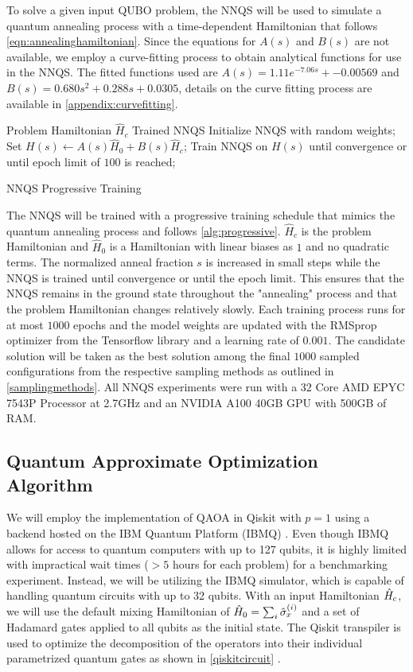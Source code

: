 To solve a given input QUBO problem, the NNQS will be used to simulate a quantum annealing process with a time-dependent Hamiltonian that follows \autoref{eqn:annealinghamiltonian}. Since the equations for $A(s)$ and $B(s)$ are not available, we employ a curve-fitting process to obtain analytical functions for use in the NNQS. The fitted functions used are $A(s) = 1.11e^{-7.06s} + -0.00569$ and $B(s)= 0.680s^2 + 0.288s + 0.0305$, details on the curve fitting process are available in \autoref{appendix:curvefitting}.

\begin{algorithm}
    \begin{algorithmic}
    \Require Problem Hamiltonian $\hat{H}_c$
    \Ensure Trained NNQS
    \State Initialize NNQS with random weights;
    \State Set $H(s) \leftarrow A(s)\hat{H}_0 + B(s)\hat{H}_c$;
    \State Train NNQS on $H(s)$ until convergence or until epoch limit of $100$ is reached;
    \EndFor
    \end{algorithmic}
    \caption{NNQS Progressive Training}
    \label{alg:progressive}
\end{algorithm}

The NNQS will be trained with a progressive training schedule that mimics the quantum annealing process and follows \autoref{alg:progressive}. $\hat{H}_c$ is the problem Hamiltonian and $\hat{H}_0$ is a Hamiltonian with linear biases as $1$ and no quadratic terms. The normalized anneal fraction $s$ is increased in small steps while the NNQS is trained until convergence or until the epoch limit. This ensures that the NNQS remains in the ground state throughout the "annealing" process and that the problem Hamiltonian changes relatively slowly. Each training process runs for at most $1000$ epochs and the model weights are updated with the RMSprop optimizer from the Tensorflow library and a learning rate of $0.001$. The candidate solution will be taken as the best solution among the final $1000$ sampled configurations from the respective sampling methods as outlined in \autoref{samplingmethods}. All NNQS experiments were run with a 32 Core AMD EPYC 7543P Processor at 2.7GHz and an NVIDIA A100 40GB GPU with 500GB of RAM.

\subsection{Quantum Approximate Optimization Algorithm}
We will employ the implementation of QAOA in Qiskit with $p=1$ using a backend hosted on the IBM Quantum Platform (IBMQ) \cite{b24}. Even though IBMQ allows for access to quantum computers with up to 127 qubits, it is highly limited with impractical wait times ($>5$ hours for each problem) for a benchmarking experiment. Instead, we will be utilizing the IBMQ simulator, which is capable of handling quantum circuits with up to 32 qubits. With an input Hamiltonian $\Hat{H}_c$, we will use the default mixing Hamiltonian of $\Hat{H}_0 = \sum_{i}\Hat{\sigma}_x^{(i)}$ and a set of Hadamard gates applied to all qubits as the initial state. The Qiskit transpiler is used to optimize the decomposition of the operators into their individual parametrized quantum gates as shown in \autoref{qiskitcircuit} \cite{qiskittranspiler}.

